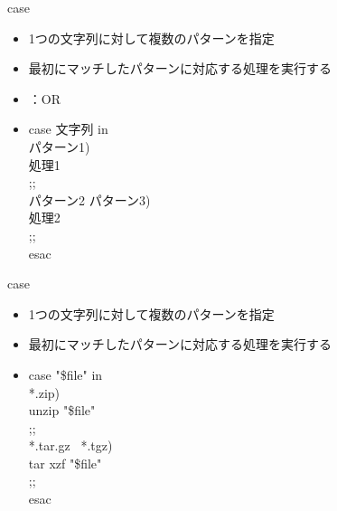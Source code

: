 \documentclass[12pt,aspectratio=169]{beamer}
\begin{document}
\begin{frame}{case}

  \begin{itemize}
    \item 1つの文字列に対して複数のパターンを指定
    \item 最初にマッチしたパターンに対応する処理を実行する
    \item \textbar ：OR
    \item case 文字列 in \\
    \hspace{0.5cm} パターン1) \\
    \hspace{1.0cm} 処理1 \\
    \hspace{1.0cm} ;; \\
    \hspace{0.5cm} パターン2 \textbar パターン3) \\
    \hspace{1.0cm} 処理2 \\
    \hspace{1.0cm} ;; \\
    esac
  \end{itemize}

\end{frame}

\begin{frame}{case}

  \begin{itemize}
    \item 1つの文字列に対して複数のパターンを指定
    \item 最初にマッチしたパターンに対応する処理を実行する
    \item case "\$file" in \\
    \hspace{0.5cm} *.zip) \\
    \hspace{1.0cm} unzip "\$file" \\
    \hspace{1.0cm} ;; \\
    \hspace{0.5cm} *.tar.gz \textbar\ *.tgz) \\
    \hspace{1.0cm} tar xzf "\$file" \\
    \hspace{1.0cm} ;; \\
    esac
  \end{itemize}

\end{frame}
\end{document}
